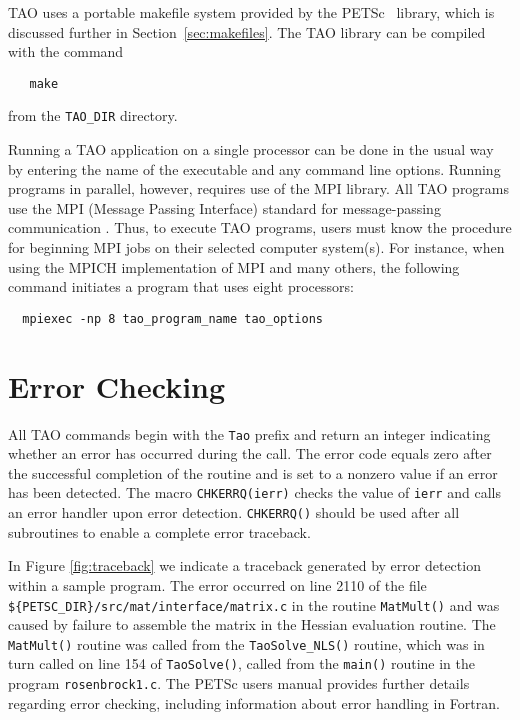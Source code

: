 TAO uses a portable makefile system provided by the
PETSc~\cite{petsc-web-page,petsc-user-ref} library, which is discussed
further in Section~\ref{sec:makefiles}.  The TAO library can be
compiled with the command
\begin{verbatim}
   make
\end{verbatim}
\noindent
from the \texttt{TAO\_DIR} directory.  

Running a TAO application on a single processor can be done in the
usual way by entering the name of the executable and any command line
options.  Running programs in parallel, however, requires use of the
MPI library.  All TAO programs use the MPI (Message Passing Interface)
standard for message-passing communication \cite{MPI-final}.  Thus, to
execute TAO programs, users must know the procedure for beginning MPI
jobs on their selected computer system(s).  For instance, when using
the MPICH implementation of MPI \cite{mpich-web-page} and many others,
the following command initiates a program that uses eight processors:
\begin{verbatim}
  mpiexec -np 8 tao_program_name tao_options
\end{verbatim}


\section{Error Checking}

All TAO commands begin with the \texttt{Tao} prefix and return an
integer indicating whether an error has occurred during the call.  The
error code equals zero after the successful completion of the routine
and is set to a nonzero value if an error has been detected.  The
macro \texttt{CHKERRQ(ierr)} checks the value of \texttt{ierr} and calls an
error handler upon error detection.  \texttt{CHKERRQ()} should be used after
all subroutines to enable a complete error traceback.

In Figure \ref{fig:traceback} we indicate a traceback generated by
error detection within a sample program. The error occurred on line
2110 of the file \texttt{\$\{PETSC\_DIR\}/src/mat/inter\-face/mat\-rix.c} in the
routine \texttt{MatMult()} and was caused by failure to assemble the 
matrix in the Hessian evaluation routine.
The \texttt{MatMult()} routine was called from
the \texttt{TaoSolve\_NLS()} routine, which was in turn called on line 
154 of \texttt{TaoSolve()}, called from the \texttt{main()} routine 
in the program \texttt{rosenbrock1.c}.  The PETSc users
manual provides further details regarding error checking, including
information about error handling in Fortran.

